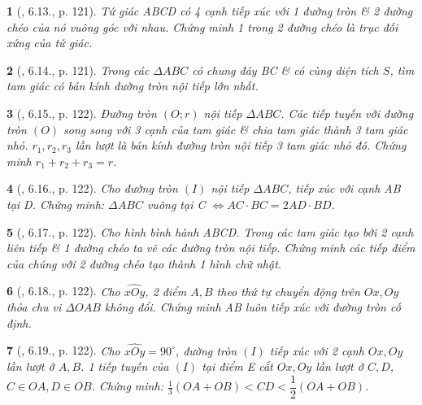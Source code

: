 \documentclass{article}
\newtheorem{baitoan}{}
\begin{document}
\begin{baitoan}[\cite{Binh_boi_duong_Toan_9_tap_1}, 6.13., p. 121]
	Tứ giác ABCD có 4 cạnh tiếp xúc với 1 đường tròn \& 2 đường chéo của nó vuông góc với nhau. Chứng minh 1 trong 2 đường chéo là trục đối xứng của tứ giác.
\end{baitoan}

\begin{baitoan}[\cite{Binh_boi_duong_Toan_9_tap_1}, 6.14., p. 121]
	Trong các $\Delta ABC$ có chung đáy BC \& có cùng diện tích $S$, tìm tam giác có bán kính đường tròn nội tiếp lớn nhất.
\end{baitoan}

\begin{baitoan}[\cite{Binh_boi_duong_Toan_9_tap_1}, 6.15., p. 122]
	Đường tròn $(O;r)$ nội tiếp $\Delta ABC$. Các tiếp tuyến với đường tròn $(O)$ song song với 3 cạnh của tam giác \& chia tam giác thành 3 tam giác nhỏ. $r_1,r_2,r_3$ lần lượt là bán kính đường tròn nội tiếp 3 tam giác nhỏ đó. Chứng minh $r_1 + r_2 + r_3 = r$.
\end{baitoan}

\begin{baitoan}[\cite{Binh_boi_duong_Toan_9_tap_1}, 6.16., p. 122]
	Cho đường tròn $(I)$ nội tiếp $\Delta ABC$, tiếp xúc với cạnh AB tại D. Chứng minh: $\Delta ABC$ vuông tại C $\Leftrightarrow AC\cdot BC = 2AD\cdot BD$.
\end{baitoan}

\begin{baitoan}[\cite{Binh_boi_duong_Toan_9_tap_1}, 6.17., p. 122]
	Cho hình bình hành ABCD. Trong các tam giác tạo bởi 2 cạnh liên tiếp \& 1 đường chéo ta vẽ các đường tròn nội tiếp. Chứng minh các tiếp điểm của chúng với 2 đường chéo tạo thành 1 hình chữ nhật.
\end{baitoan}

\begin{baitoan}[\cite{Binh_boi_duong_Toan_9_tap_1}, 6.18., p. 122]
	Cho $\widehat{xOy}$, 2 điểm $A,B$ theo thứ tự chuyển động trên $Ox,Oy$ thỏa chu vi $\Delta OAB$ không đổi. Chứng minh AB luôn tiếp xúc với đường tròn cố định.
\end{baitoan}

\begin{baitoan}[\cite{Binh_boi_duong_Toan_9_tap_1}, 6.19., p. 122]
	Cho $\widehat{xOy} = 90^\circ$, đường tròn $(I)$ tiếp xúc với 2 cạnh $Ox,Oy$ lần lượt ở $A,B$. 1 tiếp tuyến của $(I)$ tại điểm E cắt $Ox,Oy$ lần lượt ở $C,D$, $C\in OA,D\in OB$. Chứng minh: $\frac{1}{3}(OA + OB) < CD < \dfrac{1}{2}(OA + OB)$.
\end{baitoan}
\end{document}
